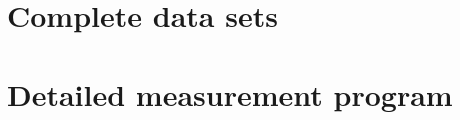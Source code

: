\chapter{Complete data sets}

\FloatBarrier
{ 
\chapter{Detailed measurement program} 
}

\clearpage
\begin{comment}
VC 1\\
VC 3\\
VC 2\\
VC 1\\
Thyro\\
VC 1\\
VC 0.75\\
VC 0.5\\
VC 1\\
VC 0.75\\
VC 0.5\\
VC 1\\
VC 0.75\\
VC 0.5\\
\end{comment}

\printbibliography


